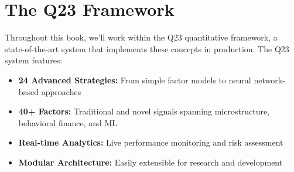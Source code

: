 \documentclass[11pt,letterpaper]{book}
\begin{document}
\section{The Q23 Framework}

Throughout this book, we'll work within the Q23 quantitative framework, a state-of-the-art system that implements these concepts in production. The Q23 system features:

\begin{itemize}
    \item \textbf{24 Advanced Strategies:} From simple factor models to neural network-based approaches
    \item \textbf{40+ Factors:} Traditional and novel signals spanning microstructure, behavioral finance, and ML
    \item \textbf{Real-time Analytics:} Live performance monitoring and risk assessment
    \item \textbf{Modular Architecture:} Easily extensible for research and development
\end{itemize}
\end{document}
